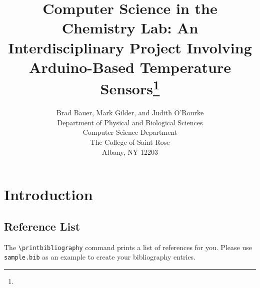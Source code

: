 \documentclass{article}
\title{
Computer Science in the Chemistry Lab: An Interdisciplinary Project Involving Arduino-Based Temperature Sensors\footnote{\protect}
}
\author{
    Brad Bauer\affmark[1], Mark Gilder\affmark[2], and Judith O'Rourke\affmark[2]\\
    \affmark[1]Department of Physical and Biological Sciences\\
    \affmark[2]Computer Science Department\\
    The College of Saint Rose\\
    Albany, NY 12203\\
    \email{\{bauerb,gilderm,orourkej\}@strose.edu}
  }
\begin{document}
\maketitle



\section{Introduction}










\subsection{Reference List}
The \verb+\printbibliography+ command prints a list of references for you.
Please use \texttt{sample.bib} as an example to create your bibliography entries.

\end{document}
